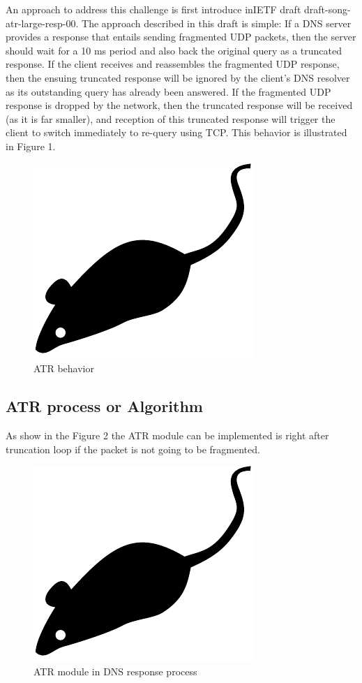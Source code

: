 An approach to address this challenge is first introduce inIETF draft draft-song-atr-large-resp-00. The approach described in this draft is simple: If a DNS server provides a response that entails sending fragmented UDP packets, then the server should wait for a 10 ms period and also back the original query as a truncated response. If the client receives and reassembles the fragmented UDP response, then the ensuing truncated response will be ignored by the client’s DNS resolver as its outstanding query has already been answered. If the fragmented UDP response is dropped by the network, then the truncated response will be received (as it is far smaller), and reception of this truncated response will trigger the client to switch immediately to re-query using TCP. This behavior is illustrated in Figure 1.

\begin{figure}[tp]
\centering
\includegraphics{figures/mouse}
\caption{ATR behavior}
\end{figure}

\subsection{ATR process or Algorithm}

As show in the Figure 2 the ATR module can be implemented is right after truncation loop if the packet is not going to be fragmented.

\begin{figure}[tp]
\centering
\includegraphics{figures/mouse}
\caption{ATR module in DNS response process}
\end{figure}

